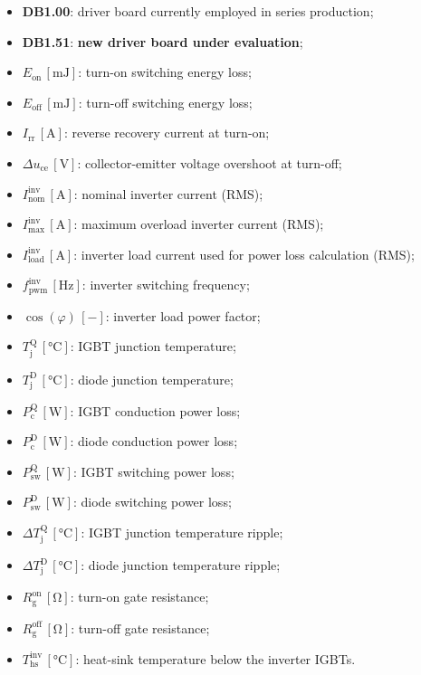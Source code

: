 \documentclass[11pt,a4paper]{scrartcl}
\begin{document}
\begin{itemize}
\begin{itemize}
			\item[--] currently employed in 690\,V EDrive applications;
		\end{itemize}
		\item[--] \textbf{DB1.00}: driver board currently employed in series production;
		\item[--] \textbf{DB1.51}: \textbf{new driver board under evaluation};
		\item[--] $E_\text{on}$\,$\left[\si{\milli\joule}\right]$: turn-on switching energy loss;
		\item[--] $E_\text{off}$\,$\left[\si{\milli\joule}\right]$: turn-off switching energy loss;
		\item[--] $I_\text{rr}$\,$\left[\si{\ampere}\right]$: reverse recovery current at turn-on;
		\item[--] $\Delta u_\text{ce}$\,$\left[\si{\volt}\right]$: collector-emitter voltage overshoot at turn-off;
		\item[--] $I_\text{nom}^\text{inv}$\,$\left[\si{\ampere}\right]$: nominal inverter current (RMS);
		\item[--] $I_\text{max}^\text{inv}$\,$\left[\si{\ampere}\right]$: maximum overload inverter current (RMS);
		\item[--] $I_\text{load}^\text{inv}$\,$\left[\si{\ampere}\right]$: inverter load current used for power loss calculation (RMS);
		\item[--] $f_\text{pwm}^\text{inv}$\,$\left[\si{\hertz}\right]$: inverter switching frequency;
		\item[--] $\cos(\varphi)$\,$\left[-\right]$: inverter load power factor;
		\item[--] $T_\text{j}^\text{Q}$\,$\left[\si{\celsius}\right]$: IGBT junction temperature;
		\item[--] $T_\text{j}^\text{D}$\,$\left[\si{\celsius}\right]$: diode junction temperature;
		\item[--] $P_\text{c}^\text{Q}$\,$\left[\si{\watt}\right]$: IGBT conduction power loss;
		\item[--] $P_\text{c}^\text{D}$\,$\left[\si{\watt}\right]$: diode conduction power loss;
		\item[--] $P_\text{sw}^\text{Q}$\,$\left[\si{\watt}\right]$: IGBT switching power loss;
		\item[--] $P_\text{sw}^\text{D}$\,$\left[\si{\watt}\right]$: diode switching power loss;
		\item[--] $\Delta T_\text{j}^\text{Q}$\,$\left[\si{\celsius}\right]$: IGBT junction temperature ripple;
		\item[--] $\Delta T_\text{j}^\text{D}$\,$\left[\si{\celsius}\right]$: diode junction temperature ripple;
		\item[--] $R_\text{g}^\text{on}$\,$\left[\si{\ohm}\right]$: turn-on gate resistance;
		\item[--] $R_\text{g}^\text{off}$\,$\left[\si{\ohm}\right]$: turn-off gate resistance;
		\item[--] $T_\text{hs}^\text{inv}$\,$\left[\si{\celsius}\right]$: heat-sink temperature below the inverter IGBTs.
	\end{itemize}
	\newpage
\end{document}
